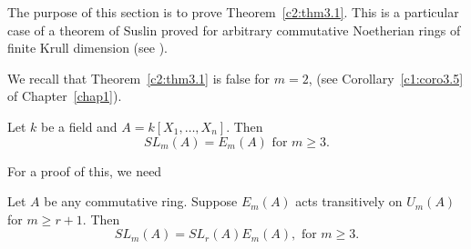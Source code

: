The purpose of this section is to prove Theorem~\ref{c2:thm3.1}. This
is a particular case of a theorem of Suslin proved for arbitrary
commutative Noetherian rings of finite Krull dimension (see
\cite[][Theorem~6.3]{Suslina}).

We recall that Theorem~\ref{c2:thm3.1} is false for $m=2$, (see
Corollary~\ref{c1:coro3.5} of Chapter~\ref{chap1}).

\begin{thm}\label{c2:thm3.1}
Let $k$ be a field and $A=k[X_1,\ldots,X_n]$. Then 
$$
SL_m(A)=E_m(A)\text{ for } m\geq 3.
$$

For a proof of this, we need
\end{thm}

\begin{lem}\label{c2:lem3.2}
Let $A$ be any commutative ring. Suppose $E_m(A)$ acts transitively
on $U_m(A)$ for $m\geq r+1$. Then 
$$
SL_m(A)=SL_r(A)E_m(A),\text{ for } m\geq 3.
$$
\end{lem}

